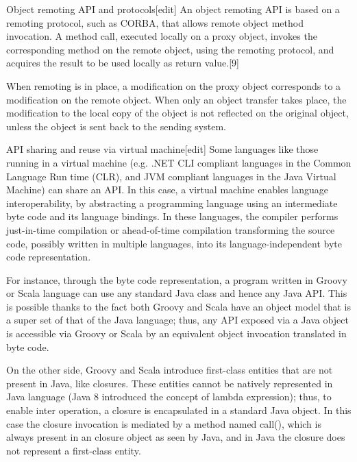 Object remoting API and protocols[edit]
An object remoting API is based on a remoting protocol, such as CORBA, that allows remote object method invocation.
 A method call, executed locally on a proxy object, invokes the corresponding method on the remote object, using the remoting protocol, and acquires the result to be used locally as return value.[9]

When remoting is in place, a modification on the proxy object corresponds to a modification on the remote object.
When only an object transfer takes place, the modification to the local copy of the object is not reflected on the original object, unless the object is sent back to the sending system.

API sharing and reuse via virtual machine[edit]
Some languages like those running in a virtual machine (e.g. .NET CLI compliant languages in the Common Language Run time (CLR), and JVM compliant languages in the Java Virtual Machine) can share an API. 
In this case, a virtual machine enables language interoperability, by abstracting a programming language using an intermediate byte code and its language bindings.
 In these languages, the compiler performs just-in-time compilation or ahead-of-time compilation transforming the source code, possibly written in multiple languages, into its language-independent byte code representation.

For instance, through the byte code representation, a program written in Groovy or Scala language can use any standard Java class and hence any Java API. 
This is possible thanks to the fact both Groovy and Scala have an object model that is a super set of that of the Java language; thus, any API exposed via a Java object is accessible via Groovy or Scala by an equivalent object invocation translated in byte code.

On the other side, Groovy and Scala introduce first-class entities that are not present in Java, like closures. 
These entities cannot be natively represented in Java language (Java 8 introduced the concept of lambda expression); thus, to enable inter operation, a closure is encapsulated in a standard Java object. 
In this case the closure invocation is mediated by a method named call(), which is always present in an closure object as seen by Java, and in Java the closure does not represent a first-class entity.

